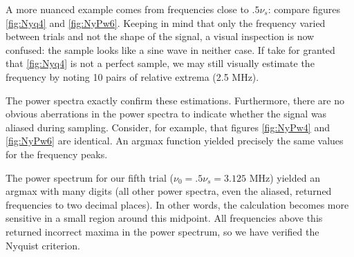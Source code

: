 \documentclass[a4paper]{article}
\begin{document}
A more nuanced example comes from frequencies close to $.5 \nu_s$: compare figures \ref{fig:Nyq4} and \ref{fig:NyPw6}. Keeping in mind that only the frequency varied between trials and not the shape of the signal, a visual inspection is now confused: the sample looks like a sine wave in neither case. If take for granted that \ref{fig:Nyq4} is not a perfect sample, we may still visually estimate the frequency by noting 10 pairs of relative extrema (2.5 MHz). 



The power spectra exactly confirm these estimations. Furthermore, there are no obvious aberrations in the power spectra to indicate whether the signal was aliased during sampling. Consider, for example, that figures \ref{fig:NyPw4} and \ref{fig:NyPw6} are identical. An argmax function yielded precisely the same values for the frequency peaks.

The power spectrum for our fifth trial ($\nu_0 = .5 \nu_s = 3.125$ MHz) yielded an argmax with many digits (all other power spectra, even the aliased, returned frequencies to two decimal places). In other words, the calculation becomes more sensitive in a small region around this midpoint. All frequencies above this returned incorrect maxima in the power spectrum, so we have verified the Nyquist criterion. 

\end{document}
